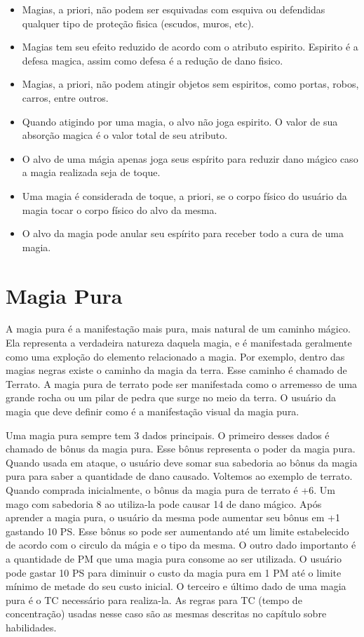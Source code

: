 \begin{itemize}
	\item Magias, a priori, não podem ser esquivadas com esquiva ou defendidas qualquer tipo de proteção fisica (escudos, muros, etc).
	\item Magias tem seu efeito reduzido de acordo com o atributo espirito. Espirito é a defesa magica, assim como defesa é a redução de dano fisico.
	\item Magias, a priori, não podem atingir objetos sem espiritos, como portas, robos, carros, entre outros.
	\item Quando atigindo por uma magia, o alvo não joga espirito. O valor de sua absorção magica é o valor total de seu atributo.
	\item O alvo de uma mágia apenas joga seus espírito para reduzir dano mágico caso a magia realizada seja de toque.
	\item Uma magia é considerada de toque, a priori, se o corpo físico do usuário da magia tocar o corpo físico do alvo da mesma.
	\item O alvo da magia pode anular seu espírito para receber todo a cura de uma magia.	
\end{itemize}


\section{Magia Pura}

A magia pura é a manifestação mais pura, mais natural de um caminho mágico. Ela representa a verdadeira natureza daquela magia, e é manifestada geralmente como uma exploção do elemento relacionado a magia. Por exemplo, dentro das magias negras existe o caminho da magia da terra. Esse caminho é chamado de Terrato. A magia pura de terrato pode ser manifestada como o arremesso de uma grande rocha ou um pilar de pedra que surge no meio da terra. O usuário da magia que deve definir como é a manifestação visual da magia pura. 

Uma magia pura sempre tem 3 dados principais. O primeiro desses dados é chamado de bônus da magia pura. Esse bônus representa o poder da magia pura. Quando usada em ataque, o usuário deve somar sua sabedoria ao bônus da magia pura para saber a quantidade de dano causado. Voltemos ao exemplo de terrato. Quando comprada inicialmente, o bônus da magia pura de terrato é +6. Um mago com sabedoria 8 ao utiliza-la pode causar 14 de dano mágico. Após aprender a magia pura, o usuário da mesma pode aumentar seu bônus em +1 gastando 10 PS. Esse bônus so pode ser aumentando até um limite estabelecido de acordo com o circulo da mágia e o tipo da mesma. O outro dado importanto é a quantidade de PM que uma magia pura consome ao ser utilizada. O usuário pode gastar 10 PS para diminuir o custo da magia pura em 1 PM até o limite mínimo de metade do seu custo inicial. O terceiro e último dado de uma magia pura é o TC necessário para realiza-la. As regras para TC (tempo de concentração) usadas nesse caso são as mesmas descritas no capítulo sobre habilidades.

